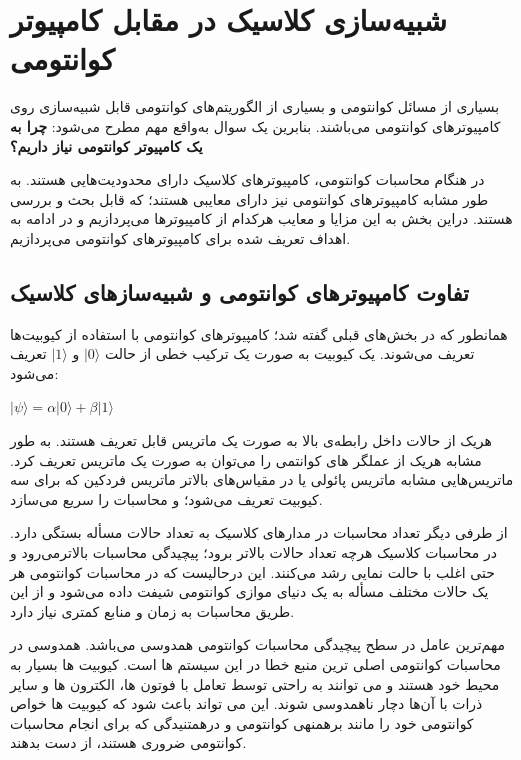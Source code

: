 \documentclass{book}
\begin{document}
\section{شبیه‌سازی کلاسیک در مقابل کامپیوتر کوانتومی}

بسیاری از مسائل کوانتومی و بسیاری از الگوریتم‌های کوانتومی قابل شبیه‌سازی روی کامپیوتر‌های کوانتومی می‌باشند. بنابرین یک سوال به‌واقع مهم مطرح می‌شود: \textbf{چرا به یک کامپیوتر کوانتومی نیاز داریم؟}

در هنگام محاسبات کوانتومی،‌ کامپیوتر‌های کلاسیک دارای محدودیت‌هایی هستند. به طور مشابه کامپیوتر‌های کوانتومی نیز دارای معایبی هستند؛ که قابل بحث و بررسی هستند. دراین بخش به این مزایا و معایب هرکدام از کامپیوترها می‌پردازیم و در ادامه به اهداف تعریف شده برای کامپیوترهای کوانتومی می‌پردازیم.


\subsection{تفاوت کامپیوترهای کوانتومی و شبیه‌سازهای کلاسیک}
همانطور که در بخش‌های قبلی گفته شد؛ کامپیوترهای کوانتومی با استفاده از کیوبیت‌ها تعریف می‌شوند. یک کیوبیت به صورت یک ترکیب خطی از حالت $\vert0\rangle$ و $\vert1\rangle$ تعریف می‌شود:

\begin{center}
	$\vert\psi\rangle = \alpha\vert0\rangle + \beta\vert1\rangle$
\end{center}

هریک از حالات داخل رابطه‌ی بالا به صورت یک ماتریس قابل تعریف هستند. به طور مشابه هریک از عملگر های کوانتمی را می‌توان به صورت یک ماتریس تعریف کرد. ماتریس‌هایی مشابه ماتریس پائولی یا در مقیاس‌های بالاتر ماتریس فردکین که برای سه کیوبیت تعریف می‌شود؛ و محاسبات را سریع می‌سازد.



از طرفی دیگر تعداد محاسبات در مدار‌های کلاسیک به تعداد حالات مسأله بستگی دارد. در محاسبات کلاسیک هرچه تعداد حالات بالاتر برود؛ پیچیدگی محاسبات بالاتر‌می‌رود و حتی اغلب با حالت نمایی رشد می‌کنند. این درحالیست که در محاسبات کوانتومی هر یک حالات مختلف مسأله به یک دنیای موازی کوانتومی شیفت داده می‌شود و از این طریق محاسبات به زمان و منابع کمتری نیاز دارد.


مهم‌ترین عامل در سطح پیچیدگی محاسبات کوانتومی همدوسی می‌باشد. 
همدوسی در محاسبات کوانتومی اصلی ترین منبع خطا در این سیستم ها است. کیوبیت ها بسیار به محیط خود هستند و می توانند به راحتی توسط  تعامل با فوتون ها، الکترون ها و سایر ذرات با آن‌ها دچار ناهمدوسی شوند. این می تواند باعث شود که کیوبیت ها خواص کوانتومی خود را مانند برهمنهی کوانتومی و درهمتنیدگی که برای انجام محاسبات کوانتومی ضروری هستند، از دست بدهند.
\end{document}
